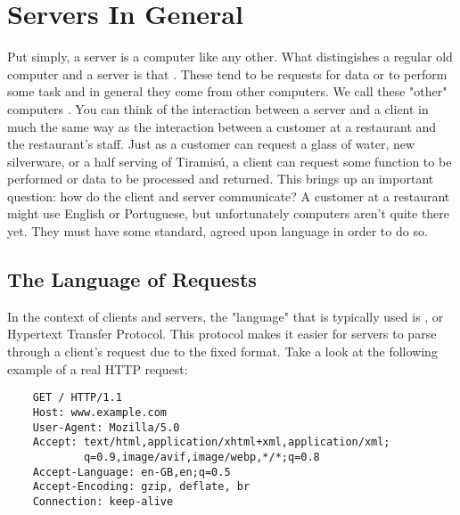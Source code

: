 \section{Servers In General}

Put simply, a server is a computer like any other. What distingishes a regular old computer and a server is that . These tend to be requests for data or to perform some task and in general they come from other computers. We call these "other" computers . You can think of the interaction between a server and a client in much the same way as the interaction between a customer at a restaurant and the restaurant's staff. Just as a customer can request a glass of water, new silverware, or a half serving of Tiramisú, a client can request some function to be performed or data to be processed and returned. This brings up an important question: how do the client and server communicate? A customer at a restaurant might use English or Portuguese, but unfortunately computers aren't quite there yet. They must have some standard, agreed upon language in order to do so.

\subsection*{The Language of Requests}

In the context of clients and servers, the "language" that is typically used is , or Hypertext Transfer Protocol. This protocol makes it easier for servers to parse through a client's request due to the fixed format. Take a look at the following example of a real HTTP request:

\begin{lstlisting}
    GET / HTTP/1.1
    Host: www.example.com
    User-Agent: Mozilla/5.0
    Accept: text/html,application/xhtml+xml,application/xml;
            q=0.9,image/avif,image/webp,*/*;q=0.8
    Accept-Language: en-GB,en;q=0.5
    Accept-Encoding: gzip, deflate, br
    Connection: keep-alive
\end{lstlisting}

